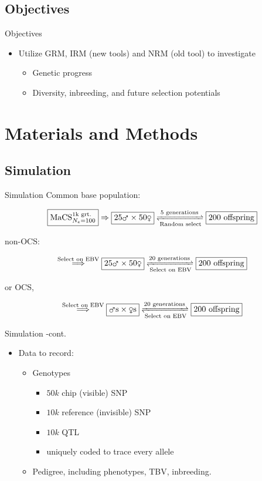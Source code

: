\documentclass{beamer}
\begin{document}
\subsection{Objectives}
\begin{frame}{Objectives}
  \begin{itemize}
  \item Utilize GRM, IRM (new tools) and NRM (old tool) to investigate
    \begin{itemize}
    \item Genetic progress
    \item Diversity, inbreeding, and future selection potentials
    \end{itemize}
  \end{itemize}
\end{frame}

\section{Materials and Methods}

\subsection{Simulation}
\begin{frame}{Simulation}
  Common base population:

  $$\boxed{\text{MaCS}_{N_e=100}^{\text{1k grt.}}}\Rightarrow\boxed{\text{25\mars}\times\text{50\female}}\xrightleftharpoons[\text{Random select}]{\text{5 generations}}\boxed{\text{200 offspring}}$$

  non-OCS:

  $$\overset{\text{Select on EBV}}\Longrightarrow\boxed{\text{25\mars}\times\text{50\female}}\xrightleftharpoons[\text{Select on EBV}]{\text{20 generations}}\boxed{\text{200 offspring}}$$

  or OCS,

  $$\overset{\text{Select on EBV}}\Longrightarrow\boxed{\text{\mars s}\times\text{\female s}}\xrightleftharpoons[\text{Select on EBV}]{\text{20 generations}}\boxed{\text{200 offspring}}$$
\end{frame}

\begin{frame}{Simulation -cont.}
  \begin{itemize}
  \item Data to record:
    \begin{itemize}
    \item Genotypes
      \begin{itemize}
      \item $50k$ chip (visible) SNP
      \item $10k$ reference (invisible) SNP
      \item $10k$ QTL
      \item uniquely coded to trace every allele
      \end{itemize}
    \item Pedigree, including phenotypes, TBV, inbreeding.
    \end{itemize}
  \end{itemize}
\end{frame}
\end{document}

